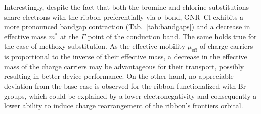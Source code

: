 Interestingly, despite the fact that both the bromine and chlorine substitutions share electrons with the ribbon preferentially via $\sigma$-bond, GNR--Cl exhibits a more pronounced bandgap contraction (Tab.~\ref{tab:bandgaps}) and a decrease in effective mass $m^*$ at the $\Gamma$ point of the conduction band. The same holds true for the case of methoxy substitution. As the effective mobility $\mu_\textrm{eff}$ of charge carriers is proportional to the inverse of their effective mass, a decrease in the effective mass of the charge carriers may be advantageous for their transport, possibly resulting in better device performance. On the other hand, no appreciable deviation from the base case is observed for the ribbon functionalized with Br groups, which could be explained by a lower electronegativity and consequently a lower ability to induce charge rearrangement of the ribbon's frontiers orbital.




